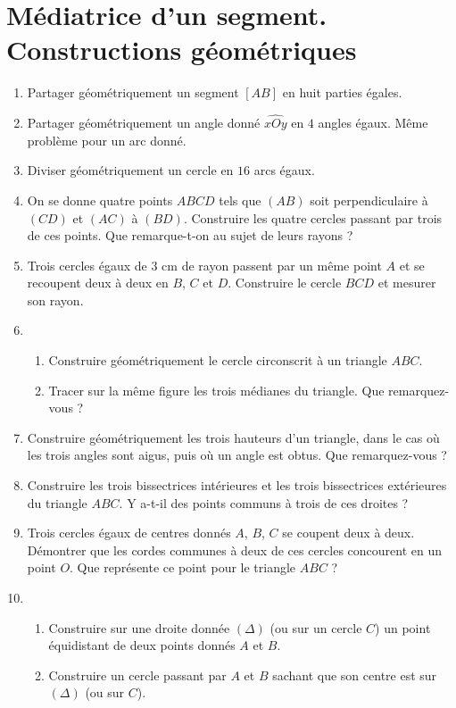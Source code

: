
\chapter{Médiatrice d'un segment. Constructions géométriques}
\begin{enumerate}
\item Partager géométriquement un segment $[AB]$ en huit parties égales. 
\item Partager géométriquement un angle donné $\widehat{xOy}$ en $4$ angles égaux. Même problème pour un arc donné. 
\item Diviser géométriquement un cercle en $16$ arcs égaux. 
\item On se donne quatre points $ABCD$ tels que $(AB)$ soit perpendiculaire à $(CD)$ et $(AC)$ à $(BD)$. Construire les quatre cercles passant par trois de ces points.
Que remarque-t-on au sujet de leurs rayons ?
\item Trois cercles égaux de $3$ cm de rayon passent par un même point $A$ et 
se recoupent deux à deux en $B$, $C$ et $D$. Construire le cercle $BCD$ et mesurer
son rayon. 
\item \begin{enumerate}
\item Construire géométriquement le cercle circonscrit à un triangle $ABC$. 
\item Tracer sur la même figure les trois médianes du triangle. Que remarquez-vous ?
\end{enumerate}
\item Construire géométriquement les trois hauteurs d'un triangle, dans le cas où les trois angles sont aigus, puis où un angle est obtus. Que remarquez-vous ? 
\item Construire les trois bissectrices intérieures et les trois bissectrices extérieures du triangle $ABC$. Y a-t-il des points communs à trois de ces droites ?
\item Trois cercles égaux de centres donnés $A$, $B$, $C$ se coupent deux à deux. 
Démontrer que les cordes communes à deux de ces cercles concourent en un point $O$. 
Que représente ce point pour le triangle $ABC$ ? 
\item 
\begin{enumerate}
\item Construire sur une droite donnée $(\Delta)$ (ou sur un cercle $C$) un point équidistant de deux points donnés $A$ et $B$. 
\item Construire un cercle passant par $A$ et $B$ sachant que son centre est sur $(\Delta)$ (ou sur $C$).

\end{enumerate}
\end{enumerate}

